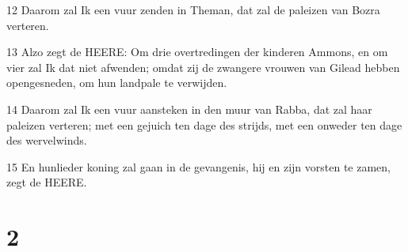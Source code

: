 \par 12 Daarom zal Ik een vuur zenden in Theman, dat zal de paleizen van Bozra verteren.
\par 13 Alzo zegt de HEERE: Om drie overtredingen der kinderen Ammons, en om vier zal Ik dat niet afwenden; omdat zij de zwangere vrouwen van Gilead hebben opengesneden, om hun landpale te verwijden.
\par 14 Daarom zal Ik een vuur aansteken in den muur van Rabba, dat zal haar paleizen verteren; met een gejuich ten dage des strijds, met een onweder ten dage des wervelwinds.
\par 15 En hunlieder koning zal gaan in de gevangenis, hij en zijn vorsten te zamen, zegt de HEERE.

\chapter{2}

